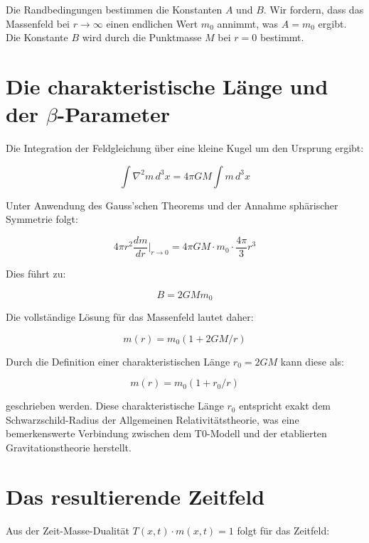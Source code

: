 \documentclass[12pt,a4paper]{report}
\begin{document}
	Die Randbedingungen bestimmen die Konstanten $A$ und $B$. Wir fordern, dass das Massenfeld bei $r \to \infty$ einen endlichen Wert $m_0$ annimmt, was $A = m_0$ ergibt. Die Konstante $B$ wird durch die Punktmasse $M$ bei $r = 0$ bestimmt.
	
	\section{Die charakteristische Länge und der $\beta$-Parameter}
	
	Die Integration der Feldgleichung über eine kleine Kugel um den Ursprung ergibt:
	
	\begin{equation}
		\int \nabla^2 m \, d^3x = 4\pi G M \int m \, d^3x
	\end{equation}
	
	Unter Anwendung des Gauss'schen Theorems und der Annahme sphärischer Symmetrie folgt:
	
	\begin{equation}
		4\pi r^2 \frac{dm}{dr}\bigg|_{r\to 0} = 4\pi G M \cdot m_0 \cdot \frac{4\pi}{3}r^3
	\end{equation}
	
	Dies führt zu:
	
	\begin{equation}
		B = 2GM m_0
	\end{equation}
	
	Die vollständige Lösung für das Massenfeld lautet daher:
	
	\begin{equation}
		m(r) = m_0(1 + 2GM/r)
	\end{equation}
	
	Durch die Definition einer charakteristischen Länge $r_0 = 2GM$ kann diese als:
	
	\begin{equation}
		m(r) = m_0(1 + r_0/r)
	\end{equation}
	
	geschrieben werden. Diese charakteristische Länge $r_0$ entspricht exakt dem Schwarzschild-Radius der Allgemeinen Relativitätstheorie, was eine bemerkenswerte Verbindung zwischen dem T0-Modell und der etablierten Gravitationstheorie herstellt.
	
	\section{Das resultierende Zeitfeld}
	
	Aus der Zeit-Masse-Dualität $T(x,t) \cdot m(x,t) = 1$ folgt für das Zeitfeld:
	
\end{document}
